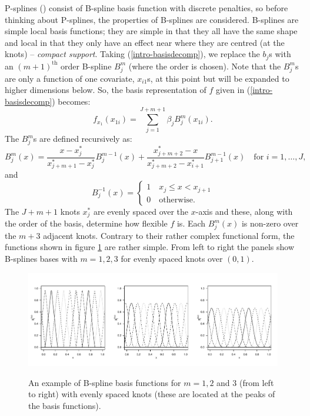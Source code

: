 P-splines (\cite{eilersmarx96}) consist of B-spline basis function with discrete penalties, so before thinking about P-splines, the properties of B-splines are considered. B-splines are simple local basis functions; they are simple in that they all have the same shape and local in that they only have an effect near where they are centred (at the knots) -- \textit{compact support}. Taking (\ref{intro-basisdecomp}), we replace the $b_j$s with an $(m+1)^\text{th}$ order B-spline $B_j^m$ (where the order is chosen). Note that the $B_j^m$s are only a function of one covariate, $x_{i1}$s, at this point but will be expanded to higher dimensions below. So, the basis representation of $f$ given in (\ref{intro-basisdecomp}) becomes:
\begin{equation*}
f_{x_1}(x_{1i}) = \sum_{j=1}^{J+m+1} \beta_j B^m_j(x_{1i}).
\end{equation*}
The $B_j^m$s are defined recursively as:
\begin{equation*}
B_j^m(x) = \frac{x-x^*_j}{x^*_{j+m+1} - x^*_j} B_j^{m-1}(x) + \frac{x^*_{j+m+2} -x}{x^*_{j+m+2} - x^*_{i+1}} B_{j+1}^{m-1}(x) \quad \text{for } i=1,\ldots,J,
\end{equation*}
and
\begin{equation*}
 B_j^{-1}(x)=\begin{cases}
1 \quad x_j \leq x < x_{j+1}\\
0 \quad \text{otherwise}. 
\end{cases}
\end{equation*}
The $J+m+1$ knots $x^*_j$ are evenly spaced over the $x$-axis and these, along with the order of the basis, determine how flexible $f$ is. Each $B^m_j(x)$ is non-zero over the $m+3$ adjacent knots. Contrary to their rather complex functional form, the functions shown in figure \ref{bs-basis} are rather simple. From left to right the panels show B-splines bases with $m=1,2,3$ for evenly spaced knots over $(0,1)$.

\begin{figure}[tb]
\centering
\includegraphics[width=\textwidth]{intro/figs/bspline-ex.pdf}\\
\caption{An example of B-spline basis functions for $m=1, 2$ and $3$ (from left to right) with evenly spaced knots (these are located at the peaks of the basis functions).}
\label{bs-basis}
\end{figure}

